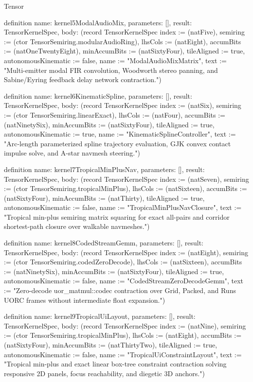 \begin{lexlean}{Tensor}
\begin{semanticmodule}
definition{
  name: kernel5ModalAudioMix,
  parameters: [],
  result: TensorKernelSpec,
  body: (record TensorKernelSpec {index := (natFive), semiring := (ctor TensorSemiring.modularAudioRing), lhsCols := (natEight), accumBits := (natOneTwentyEight), minAccumBits := (natSixtyFour), tileAligned := true, autonomousKinematic := false, name := "ModalAudioMixMatrix", text := "Multi-emitter modal FIR convolution, Woodworth stereo panning, and Sabine/Eyring feedback delay network contraction."})
}

definition{
  name: kernel6KinematicSpline,
  parameters: [],
  result: TensorKernelSpec,
  body: (record TensorKernelSpec {index := (natSix), semiring := (ctor TensorSemiring.linearExact), lhsCols := (natFour), accumBits := (natNinetySix), minAccumBits := (natSixtyFour), tileAligned := true, autonomousKinematic := true, name := "KinematicSplineController", text := "Arc-length parameterized spline trajectory evaluation, GJK convex contact impulse solve, and A-star navmesh steering."})
}

definition{
  name: kernel7TropicalMinPlusNav,
  parameters: [],
  result: TensorKernelSpec,
  body: (record TensorKernelSpec {index := (natSeven), semiring := (ctor TensorSemiring.tropicalMinPlus), lhsCols := (natSixteen), accumBits := (natSixtyFour), minAccumBits := (natThirty), tileAligned := true, autonomousKinematic := false, name := "TropicalMinPlusNavClosure", text := "Tropical min-plus semiring matrix squaring for exact all-pairs and corridor shortest-path closure over walkable navmeshes."})
}

definition{
  name: kernel8CodedStreamGemm,
  parameters: [],
  result: TensorKernelSpec,
  body: (record TensorKernelSpec {index := (natEight), semiring := (ctor TensorSemiring.codedZeroDecode), lhsCols := (natSixteen), accumBits := (natNinetySix), minAccumBits := (natSixtyFour), tileAligned := true, autonomousKinematic := false, name := "CodedStreamZeroDecodeGemm", text := "Zero-decode uor_matmul::codec contraction over Grid, Packed, and Runs UORC frames without intermediate float expansion."})
}

definition{
  name: kernel9TropicalUiLayout,
  parameters: [],
  result: TensorKernelSpec,
  body: (record TensorKernelSpec {index := (natNine), semiring := (ctor TensorSemiring.tropicalMinPlus), lhsCols := (natEight), accumBits := (natSixtyFour), minAccumBits := (natThirtyTwo), tileAligned := true, autonomousKinematic := false, name := "TropicalUiConstraintLayout", text := "Tropical min-plus and exact linear box-tree constraint contraction solving responsive 2D panels, focus reachability, and diegetic 3D anchors."})
}


\end{semanticmodule}
\end{lexlean}
